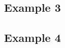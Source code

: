 \documentclass{article}
\begin{document}




\subsection{Example 3}



\subsection{Example 4}




\end{document}
